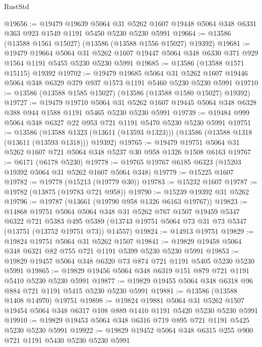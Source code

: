 \begin{lexlean}{RustStd}
\begin{coremodule}
@19656 := @19479
    @19639
    @5064
    @31
    @5262
    @1607
    @19448
    @5064
    @348
    @6331
    @363
    @923
    @1549
    @1191
    @5450
    @5230
    @5230
    @5991
@19664 := @13586 (@13588 @1561 @15027) (@13586 (@13588 @1556 @15027) @19392)
@19681 := @19479
    @19664
    @5064
    @31
    @5262
    @1607
    @19447
    @5064
    @348
    @6330
    @371
    @929
    @1564
    @1191
    @5455
    @5230
    @5230
    @5991
@19685 := @13586 (@13588 @1571 @15115) @19392
@19702 := @19479
    @19685
    @5064
    @31
    @5262
    @1607
    @19446
    @5064
    @348
    @6329
    @379
    @937
    @1573
    @1191
    @5460
    @5230
    @5230
    @5991
@19710 := @13586 (@13588 @1585 @15027) (@13586 (@13588 @1580 @15027) @19392)
@19727 := @19479
    @19710
    @5064
    @31
    @5262
    @1607
    @19445
    @5064
    @348
    @6328
    @388
    @944
    @1588
    @1191
    @5465
    @5230
    @5230
    @5991
@19739 := @19484 @999 @5064 @348 @6327 @22 @953 @721 @1191 @5470 @5230 @5230 @5991
@19751 := @13586
    (@13588 @1323 (@13611 (@13593 @1323)))
    (@13586 (@13588 @1318 (@13611 (@13593 @1318))) @19392)
@19765 := @19479 @19751 @5064 @31 @5262 @1607 @721 @5064 @348 @5237 @30 @958 @1326 @1508 @6163
@19767 := @6171 (@6178 @5230)
@19778 := @19765 @19767 @6185 @6323 (@15203 @19392 @5064 @31 @5262 @1607 @5064 @348)
@19779 := @15225 @1607
@19782 := @19778 (@15213 (@19779 @30))
@19783 := @15232 @1607
@19787 := @19782 (@13875 (@19783 @721 @958))
@19790 := @15239 @19392 @31 @5262
@19796 := @19787 (@13661 (@19790 @958 @1326 @6163 @19767))
@19823 := @14868
    @19751
    @5064
    @5064
    @348
    @31
    @5262
    @767
    @1507
    @19459
    @5347
    @6322
    @721
    @5383
    @495
    @5389
    (@13743 @19751 @5064 @73 @31 @73 @5347 (@13751 (@13752 @19751 @73)) @14557)
@19824 := @14913 @19751
@19829 := @19824 @19751 @5064 @31 @5262 @1507
@19841 := @19829 @19458 @5064 @348 @6321 @82 @755 @721 @1191 @5399 @5230 @5230 @5991
@19853 := @19829 @19457 @5064 @348 @6320 @73 @874 @721 @1191 @5405 @5230 @5230 @5991
@19865 := @19829 @19456 @5064 @348 @6319 @151 @879 @721 @1191 @5410 @5230 @5230 @5991
@19877 := @19829 @19455 @5064 @348 @6318 @96 @884 @721 @1191 @5415 @5230 @5230 @5991
@19881 := @13586 (@13588 @1408 @14970) @19751
@19898 := @19824
    @19881
    @5064
    @31
    @5262
    @1507
    @19454
    @5064
    @348
    @6317
    @108
    @889
    @1410
    @1191
    @5420
    @5230
    @5230
    @5991
@19910 := @19829 @19453 @5064 @348 @6316 @719 @895 @721 @1191 @5425 @5230 @5230 @5991
@19922 := @19829 @19452 @5064 @348 @6315 @255 @900 @721 @1191 @5430 @5230 @5230 @5991

\end{coremodule}
\end{lexlean}
